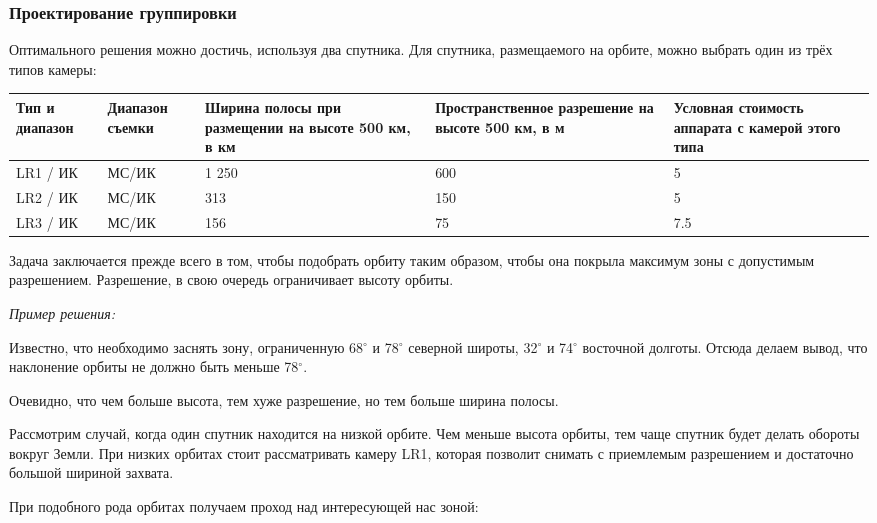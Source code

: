 \subsubsection*{Проектирование группировки}

Оптимального решения можно достичь, используя два спутника. Для спутника, размещаемого на орбите, можно выбрать один из трёх типов камеры:

\begin{table}[H]
    \center
    \begin{tabular}{|p{2cm}|p{2cm}|p{4cm}|p{4cm}|p{4cm}|}
        \hline
        Тип и диапазон	&Диапазон съемки	&Ширина полосы при размещении на высоте 500 км, в км	&Пространственное разрешение на высоте 500 км, в м	&Условная стоимость аппарата с камерой этого типа  \\
        \hline
        LR1 / ИК	&МС/ИК	&1 250	&600	&5 \\
        \hline
        LR2 / ИК	&МС/ИК	&313	&150	&5 \\
        \hline
        LR3 / ИК	&МС/ИК	&156 & 75	&7.5 \\
        \hline
    \end{tabular}
\end{table}

Задача заключается прежде всего в том, чтобы подобрать орбиту таким образом, чтобы она покрыла максимум зоны с допустимым разрешением. Разрешение, в свою очередь ограничивает высоту орбиты.

\textit{Пример решения:}

Известно, что необходимо заснять зону, ограниченную 68$^\circ$ и 78$^\circ$ северной широты, 32$^\circ$ и 74$^\circ$ восточной долготы. Отсюда делаем вывод, что наклонение орбиты не должно быть меньше 78$^\circ$.

Очевидно, что чем больше высота, тем хуже разрешение, но тем больше ширина полосы. 

Рассмотрим случай, когда один спутник находится на низкой орбите. Чем меньше высота орбиты, тем чаще спутник будет делать обороты вокруг Земли. При низких орбитах стоит рассматривать камеру LR1, которая позволит снимать с приемлемым разрешением и достаточно большой шириной захвата.



При подобного рода орбитах получаем проход над интересующей нас зоной:


